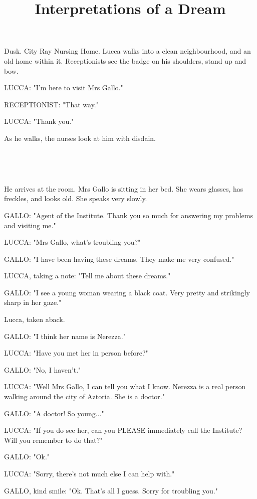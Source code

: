 \documentclass[11pt]{article}
\begin{document}
\ttfamily
\title{Interpretations of a Dream}
\maketitle

Dusk. City Ray Nursing Home.
Lucca walks into a clean neighbourhood, and an old home within it.
Receptionists see the badge on his shoulders, stand up and bow. 

LUCCA: "I'm here to visit Mrs Gallo."

RECEPTIONIST: "That way."

LUCCA: "Thank you."

As he walks, the nurses look at him with disdain.

\ 

\ 

He arrives at the room.
Mrs Gallo is sitting in her bed.
She wears glasses, has freckles, and looks old.
She speaks very slowly.

GALLO: "Agent of the Institute. 
Thank you so much for answering my problems and visiting me."

LUCCA: "Mrs Gallo, what's troubling you?"

GALLO: "I have been having these dreams.
They make me very confused."

LUCCA, taking a note: "Tell me about these dreams."

GALLO: "I see a young woman wearing a black coat.
Very pretty and strikingly sharp in her gaze."

Lucca, taken aback.

GALLO: "I think her name is Nerezza."

LUCCA: "Have you met her in person before?"

GALLO: "No, I haven't."

LUCCA: "Well Mrs Gallo, I can tell you what I know.
Nerezza is a real person walking around the city of Aztoria.
She is a doctor."

GALLO: "A doctor! 
So young..."

LUCCA: "If you do see her, can you PLEASE immediately call the Institute?
Will you remember to do that?"

GALLO: "Ok."

LUCCA: "Sorry, there's not much else I can help with."

GALLO, kind smile: "Ok. That's all I guess.
Sorry for troubling you."

\ 

\ 
\end{document}
